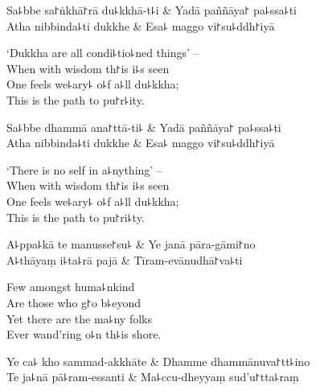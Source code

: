 \begin{twochants}
  Sa꜕bbe sa꜓ṅkhā꜓rā du꜕kkhā-t꜕i & Yadā paññāya꜓ pa꜕ssa꜕ti \\
  Atha nibbinda꜕ti dukkhe & Esa꜕ maggo vi꜓su꜕ddh꜓iyā \\
\end{twochants}

\begin{english}
  `Dukkha are all condi꜕tio꜕ned things' --\\
  When with wisdom th꜓is i꜕s seen\\
  One feels we꜕ary꜕ o꜕f a꜕ll du꜕kkha;\\
  This is the path to pu꜓r꜕ity.
\end{english}

\begin{twochants}
  Sa꜕bbe dhammā ana꜓ttā-ti꜕ & Yadā paññāya꜓ pa꜕ssa꜕ti \\
  Atha nibbinda꜕ti dukkhe & Esa꜕ maggo vi꜓su꜕ddh꜓iyā \\
\end{twochants}

\begin{english}
  `There is no self in a꜕nything' --\\
  When with wisdom th꜓is i꜕s seen\\
  One feels we꜕ary꜕ o꜕f a꜕ll du꜕kkha;\\
  This is the path to pu꜓ri꜕ty.
\end{english}

\begin{twochants}
  A꜕ppa꜕kā te manusse꜓su꜕ & Ye janā pāra-gāmi꜓no \\
  A꜕thāyaṃ i꜕ta꜕rā pajā & Tīram-evānudhā꜓va꜕ti \\
\end{twochants}

\begin{english}
  Few amongst huma꜕nkind\\
  Are those who g꜓o b꜕eyond\\
  Yet there are the ma꜕ny folks\\
  Ever wand'ring o꜕n th꜕is shore.
\end{english}

\begin{twochants}
  Ye ca꜕ kho sammad-akkhāte & Dhamme dhammānuva꜓tt꜕ino \\
  Te ja꜕nā pā꜕ram-essanti & Ma꜕ccu-dheyyaṃ sud'u꜓tta꜕raṃ \\
\end{twochants}

